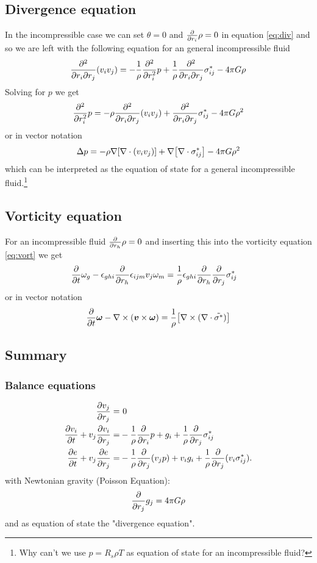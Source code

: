 \subsection{Divergence equation}
In the incompressible case we can set $\theta=0$ and $\pd{r_i}\rho=0$ in
equation \eqref{eq:div} and so we are left with the following equation for an
general incompressible fluid
\begin{align}
\frac{\partial^2}{\partial r_i \partial r_j}(v_i v_j) = 
-\frac{1}{\rho}\pdd{r_i}p 
+\frac{1}{\rho}\frac{\partial^2}{\partial r_i \partial r_j}\sigma^*_{ij} 
- 4\pi G \rho
\end{align}
Solving for $p$ we get
\begin{align}
\pdd{r_i}p= 
-\rho \frac{\partial^2}{\partial r_i \partial r_j}(v_i v_j)
+\frac{\partial^2}{\partial r_i \partial r_j}\sigma^*_{ij} 
-4\pi G \rho^2
\end{align}
or in vector notation
\begin{align}
\Delta p = 
-\rho \nabla\lrb{\nabla\cdot(v_i v_j)} 
+\nabla\lrb{\nabla\cdot \sigma^*_{ij}}
- 4\pi G \rho^2
\end{align}
which can be interpreted as the equation of state for a general
incompressible fluid.\footnote{Why can't we use $p=R_s \rho T$ as equation of
state for an incompressible fluid?} 

\subsection{Vorticity equation}
For an incompressible fluid $\pd{r_h}\rho = 0$ and inserting this into
the vorticity equation \eqref{eq:vort} we get
\begin{align}
\pd{t}\omega_g
&-\epsilon_{ghi}\pd{r_h} \epsilon_{ijm} v_j \omega_m =
\frac{1}{\rho}\epsilon_{ghi}\pd{r_h}\pd{r_j}\sigma^*_{ij}
\end{align}
or in vector notation
\begin{align}
\pd{t} \vec{\omega}-\nabla \times (\vec{v} \times \vec{\omega}) = 
\frac{1}{\rho} \lrb{\nabla \times (\nabla \cdot \tilde{\sigma^*})}
\end{align}

\subsection{Summary}
\subsubsection*{Balance equations}
\begin{align}
\ppd{r_j}{v_j} =&\ 0 \label{eq:icmass}\\
\ppd{t}{v_i} + v_j \ppd{r_j}{v_i} =& -\frac{1}{\rho}\pd{r_i}p + g_i
+\frac{1}{\rho}\pd{r_j}\sigma^*_{ij}\label{eq:icmom}\\
\ppd{t}{e} + v_j \ppd{r_j}{e} =& -\frac{1}{\rho} \pd{r_j}(v_j p) + v_i g_i
+\frac{1}{\rho}\pd{r_j}(v_i \sigma^*_{ij}).\label{eq:icetot}
\end{align}
with Newtonian gravity (Poisson Equation):
\begin{align}
\pd{r_j}g_j=4\pi G \rho
\end{align}
and as equation of state the "divergence equation".

